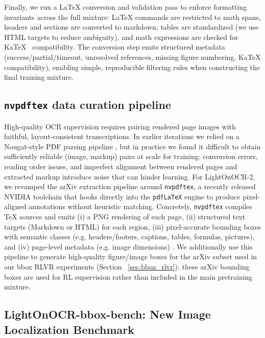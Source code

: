 \documentclass{article}
\begin{document}
Finally, we run a \LaTeX{} conversion and validation pass to enforce formatting invariants across the full mixture: \LaTeX{} commands are restricted to math spans, headers and sections are converted to markdown, tables are standardized (we use HTML targets to reduce ambiguity), and math expressions are checked for KaTeX~\cite{katex} compatibility. The conversion step emits structured metadata (success/partial/timeout, unresolved references, missing figure numbering, KaTeX compatibility), enabling simple, reproducible filtering rules when constructing the final training mixture.


\subsection{\texttt{nvpdftex} data curation pipeline}
\label{nvpdftex}
High-quality OCR supervision requires pairing rendered page images with faithful, layout-consistent transcriptions. In earlier iterations we relied on a Nougat-style PDF parsing pipeline \cite{Nougat}, but in practice we found it difficult to obtain sufficiently reliable (image, markup) pairs at scale for training: conversion errors, reading order issues, and imperfect alignment between rendered pages and extracted markup introduce noise that can hinder learning. For LightOnOCR-2, we revamped the arXiv extraction pipeline around \texttt{nvpdftex}, a recently released NVIDIA toolchain that hooks directly into the \texttt{pdf\LaTeX{}} engine to produce pixel-aligned annotations without heuristic matching. Concretely, \texttt{nvpdftex} compiles \TeX{} sources and emits (i) a PNG rendering of each page, (ii) structured text targets (Markdown or HTML) for each region, (iii) pixel-accurate bounding boxes with semantic classes (e.g. headers/footers, captions, tables, formulas, pictures), and (iv) page-level metadata (e.g. image dimensions) \cite{nvtexlive2025,eclair2025}. We additionally use this pipeline to generate high-quality figure/image boxes for the arXiv subset used in our bbox RLVR experiments (Section ~\ref{sec:bbox_rlvr}); these arXiv bounding boxes are used for RL supervision rather than included in the main pretraining mixture.

\subsection{LightOnOCR-bbox-bench: New Image Localization Benchmark}
\label{sec:bbox_bench}
\end{document}
